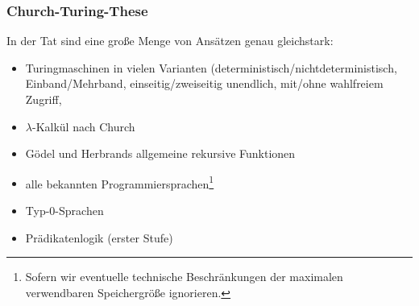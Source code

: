 \documentclass[onlymath]{beamer}
\begin{document}
\begin{frame}

\end{frame}

\begin{frame}\frametitle{Church-Turing-These}


In der Tat sind eine große Menge von Ansätzen genau gleichstark:
\begin{itemize}
\item Turingmaschinen in vielen Varianten (deterministisch/nichtdeterministisch, Einband/Mehrband,
einseitig/zweiseitig unendlich, mit/ohne wahlfreiem Zugriff, \ghost{\ldots)}
\item $\lambda$-Kalkül nach Church
\item Gödel und Herbrands allgemeine rekursive Funktionen
\item alle bekannten Programmiersprachen\footnote{Sofern wir eventuelle technische Beschränkungen der maximalen verwendbaren Speichergröße ignorieren.}
\item Typ-0-Sprachen
\item Prädikatenlogik (erster Stufe)
\end{itemize}

\end{frame}

\end{document}
